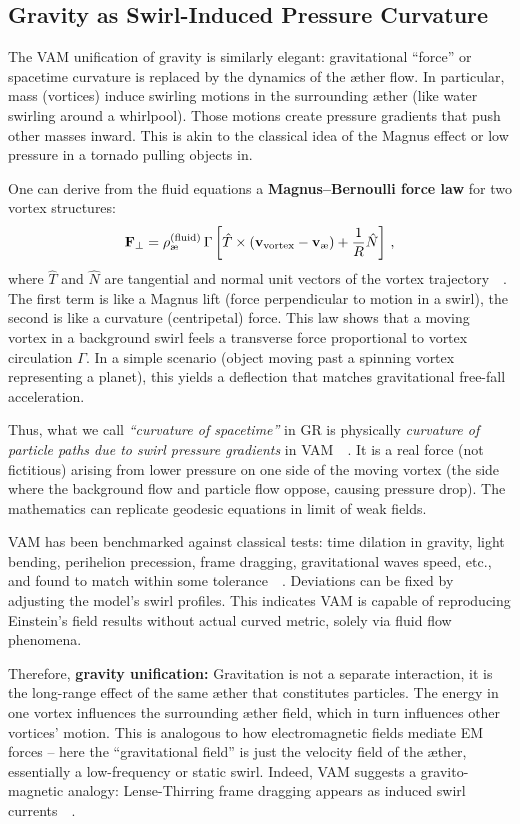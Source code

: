 \documentclass[preprint]{revtex4-2}
\begin{document}
    \subsection{Gravity as Swirl-Induced Pressure Curvature}
    The VAM unification of gravity is similarly elegant: gravitational “force” or spacetime curvature is replaced by the dynamics of the æther flow. In particular, mass (vortices) induce swirling motions in the surrounding æther (like water swirling around a whirlpool). Those motions create pressure gradients that push other masses inward. This is akin to the classical idea of the Magnus effect or low pressure in a tornado pulling objects in.

    One can derive from the fluid equations a \textbf{Magnus–Bernoulli force law} for two vortex structures:
    \[
        \mathbf{F}_\perp = \rho_{\text{\ae}}^{(\text{fluid})}\,\Gamma \left[ \hat{T} \times (\mathbf{v}_{\rm vortex}-\mathbf{v}_{\text{\ae}}) + \frac{1}{R}\hat{N} \right]\,,
    \]
    where $\hat{T}$ and $\hat{N}$ are tangential and normal unit vectors of the vortex trajectory~\cite{reference_145}~\cite{reference_146}. The first term is like a Magnus lift (force perpendicular to motion in a swirl), the second is like a curvature (centripetal) force. This law shows that a moving vortex in a background swirl feels a transverse force proportional to vortex circulation $\Gamma$. In a simple scenario (object moving past a spinning vortex representing a planet), this yields a deflection that matches gravitational free-fall acceleration.

    Thus, what we call \emph{“curvature of spacetime”} in GR is physically \emph{curvature of particle paths due to swirl pressure gradients} in VAM~\cite{reference_147}~\cite{reference_148}. It is a real force (not fictitious) arising from lower pressure on one side of the moving vortex (the side where the background flow and particle flow oppose, causing pressure drop). The mathematics can replicate geodesic equations in limit of weak fields.

    VAM has been benchmarked against classical tests: time dilation in gravity, light bending, perihelion precession, frame dragging, gravitational waves speed, etc., and found to match within some tolerance~\cite{reference_149}~\cite{reference_150}. Deviations can be fixed by adjusting the model’s swirl profiles. This indicates VAM is capable of reproducing Einstein’s field results without actual curved metric, solely via fluid flow phenomena.

    Therefore, \textbf{gravity unification:} Gravitation is not a separate interaction, it is the long-range effect of the same æther that constitutes particles. The energy in one vortex influences the surrounding æther field, which in turn influences other vortices’ motion. This is analogous to how electromagnetic fields mediate EM forces – here the “gravitational field” is just the velocity field of the æther, essentially a low-frequency or static swirl. Indeed, VAM suggests a gravito-magnetic analogy: Lense-Thirring frame dragging appears as induced swirl currents~\cite{reference_151}~\cite{reference_152}.
\end{document}
